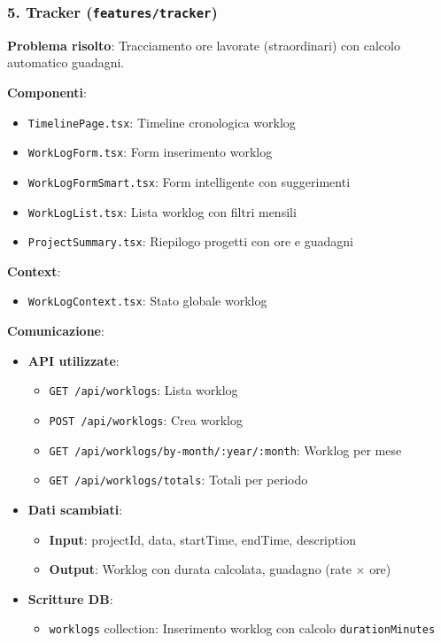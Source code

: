 \documentclass[11pt,a4paper]{article}
\begin{document}
\subsubsection{5. Tracker (\texttt{features/tracker})}

\textbf{Problema risolto}: Tracciamento ore lavorate (straordinari) con calcolo automatico guadagni.

\textbf{Componenti}:
\begin{itemize}
    \item \texttt{TimelinePage.tsx}: Timeline cronologica worklog
    \item \texttt{WorkLogForm.tsx}: Form inserimento worklog
    \item \texttt{WorkLogFormSmart.tsx}: Form intelligente con suggerimenti
    \item \texttt{WorkLogList.tsx}: Lista worklog con filtri mensili
    \item \texttt{ProjectSummary.tsx}: Riepilogo progetti con ore e guadagni
\end{itemize}

\textbf{Context}:
\begin{itemize}
    \item \texttt{WorkLogContext.tsx}: Stato globale worklog
\end{itemize}

\textbf{Comunicazione}:
\begin{itemize}
    \item \textbf{API utilizzate}: 
    \begin{itemize}
        \item \texttt{GET /api/worklogs}: Lista worklog
        \item \texttt{POST /api/worklogs}: Crea worklog
        \item \texttt{GET /api/worklogs/by-month/:year/:month}: Worklog per mese
        \item \texttt{GET /api/worklogs/totals}: Totali per periodo
    \end{itemize}
    \item \textbf{Dati scambiati}: 
    \begin{itemize}
        \item \textbf{Input}: projectId, data, startTime, endTime, description
        \item \textbf{Output}: Worklog con durata calcolata, guadagno (rate × ore)
    \end{itemize}
    \item \textbf{Scritture DB}: 
    \begin{itemize}
        \item \texttt{worklogs} collection: Inserimento worklog con calcolo \texttt{durationMinutes}
    \end{itemize}
\end{itemize}
\end{document}
